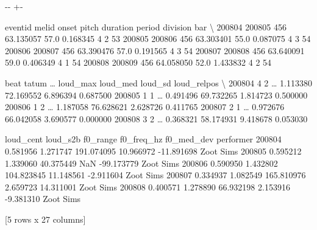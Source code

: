 \documentclass[letterpaper,10pt,english]{sphinxmanual}
\newlength\nbsphinxcodecellspacing
\begin{document}
{

\kern-\sphinxverbatimsmallskipamount\kern-\baselineskip
\kern+\FrameHeightAdjust\kern-\fboxrule
\vspace{\nbsphinxcodecellspacing}

\begin{sphinxVerbatim}[commandchars=\\\{\}]
\llap{\color{nbsphinxout}[14]:\,\hspace{\fboxrule}\hspace{\fboxsep}}        eventid  melid      onset  pitch  duration  period  division  bar  \textbackslash{}
200804   200805    456  63.135057   57.0  0.168345       4         2   53
200805   200806    456  63.303401   55.0  0.087075       4         3   54
200806   200807    456  63.390476   57.0  0.191565       4         3   54
200807   200808    456  63.640091   59.0  0.406349       4         1   54
200808   200809    456  64.058050   52.0  1.433832       4         2   54

        beat  tatum  {\ldots}  loud\_max   loud\_med   loud\_sd loud\_relpos  \textbackslash{}
200804     4      2  {\ldots}  1.113380  72.169552  6.896394    0.687500
200805     1      1  {\ldots}  0.491496  69.732265  1.814723    0.500000
200806     1      2  {\ldots}  1.187058  76.628621  2.628726    0.411765
200807     2      1  {\ldots}  0.972676  66.042058  3.690577    0.000000
200808     3      2  {\ldots}  0.368321  58.174931  9.418678    0.053030

        loud\_cent  loud\_s2b    f0\_range  f0\_freq\_hz  f0\_med\_dev  performer
200804   0.581956  1.271747  191.074095   10.966972  -11.891698  Zoot Sims
200805   0.595212  1.339060   40.375449         NaN  -99.173779  Zoot Sims
200806   0.590950  1.432802  104.823845   11.148561   -2.911604  Zoot Sims
200807   0.334937  1.082549  165.810976    2.659723   14.311001  Zoot Sims
200808   0.400571  1.278890   66.932198    2.153916   -9.381310  Zoot Sims

[5 rows x 27 columns]
\end{sphinxVerbatim}
}

{
\begin{sphinxVerbatim}[commandchars=\\\{\}]
\llap{\color{nbsphinxin}[15]:\,\hspace{\fboxrule}\hspace{\fboxsep}}  \PYG{p}{[}  \PYG{p}{]}
\end{sphinxVerbatim}
}
\end{document}
